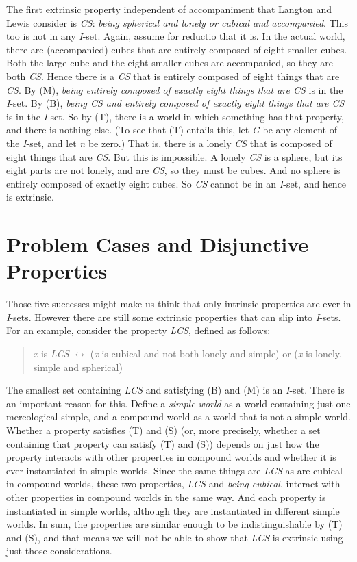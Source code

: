 \documentclass[
  10pt,
  letterpaper,
  DIV=11,
  numbers=noendperiod,
  twoside]{scrartcl}
\begin{document}
The first extrinsic property independent of accompaniment that Langton
and Lewis consider is \emph{CS}: \emph{being spherical and lonely or
cubical and accompanied}. This too is not in any \emph{I}-set. Again,
assume for reductio that it is. In the actual world, there are
(accompanied) cubes that are entirely composed of eight smaller cubes.
Both the large cube and the eight smaller cubes are accompanied, so they
are both \emph{CS}. Hence there is a \emph{CS} that is entirely composed
of eight things that are \emph{CS}. By (M), \emph{being entirely
composed of exactly eight things that are CS} is in the \emph{I}-set. By
(B), \emph{being CS and entirely composed of exactly eight things that
are CS} is in the \emph{I}-set. So by (T), there is a world in which
something has that property, and there is nothing else. (To see that (T)
entails this, let \emph{G} be any element of the \emph{I}-set, and let
\emph{n} be zero.) That is, there is a lonely \emph{CS} that is composed
of eight things that are \emph{CS}. But this is impossible. A lonely
\emph{CS} is a sphere, but its eight parts are not lonely, and are
\emph{CS}, so they must be cubes. And no sphere is entirely composed of
exactly eight cubes. So \emph{CS} cannot be in an \emph{I}-set, and
hence is extrinsic.

\section{Problem Cases and Disjunctive Properties}\label{sec-problem}

Those five successes might make us think that only intrinsic properties
are ever in \emph{I}-sets. However there are still some extrinsic
properties that can slip into \emph{I}-sets. For an example, consider
the property \emph{LCS}, defined as follows:

\begin{quote}
\emph{x} is \emph{LCS} \({\leftrightarrow}\) (\emph{x} is cubical and
not both lonely and simple) or (\emph{x} is lonely, simple and
spherical)
\end{quote}

The smallest set containing \emph{LCS} and satisfying (B) and (M) is an
\emph{I}-set. There is an important reason for this. Define a
\emph{simple world} as a world containing just one mereological simple,
and a compound world as a world that is not a simple world. Whether a
property satisfies (T) and (S) (or, more precisely, whether a set
containing that property can satisfy (T) and (S)) depends on just how
the property interacts with other properties in compound worlds and
whether it is ever instantiated in simple worlds. Since the same things
are \emph{LCS} as are cubical in compound worlds, these two properties,
\emph{LCS} and \emph{being cubical}, interact with other properties in
compound worlds in the same way. And each property is instantiated in
simple worlds, although they are instantiated in different simple
worlds. In sum, the properties are similar enough to be
indistinguishable by (T) and (S), and that means we will not be able to
show that \emph{LCS} is extrinsic using just those considerations.
\end{document}
